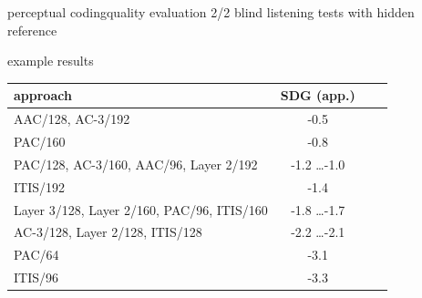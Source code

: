 	\begin{frame}{perceptual coding}{quality evaluation 2/2}
		blind listening tests with hidden reference
		
		\pause		
		example results
		\begin{table}
			\begin{center}
			\begin{footnotesize}
				\begin{tabular}{lccc}
				\hline
					\textbf{approach} & \textbf{SDG (app.)} \\
				\hline
				AAC/128, AC-3/192	& -0.5\\
				PAC/160	& -0.8\\
				PAC/128, AC-3/160, AAC/96, Layer 2/192	& -1.2 \ldots -1.0\\
				ITIS/192 	& -1.4\\
				Layer 3/128, Layer 2/160, PAC/96, ITIS/160 	& -1.8 \ldots -1.7\\
				AC-3/128, Layer 2/128, ITIS/128 	&  -2.2 \ldots -2.1\\
				PAC/64 	& -3.1\\
				ITIS/96 	& -3.3\\
				\end{tabular}  
			\end{footnotesize}
			\end{center}
		\end{table}
	\end{frame}		

